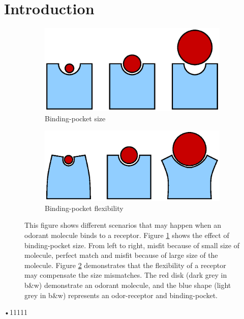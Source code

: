 \documentclass[11pt]{paper} %
\begin{document}
\section{Introduction}
\begin{figure}
	\centering
	\begin{subfigure}[b]{0.45 \textwidth}
		\includegraphics[width=\textwidth]{fig/binding-pocket}
		\caption{Binding-pocket size}
		\label{fig:pocket-size}
	\end{subfigure}
	\begin{subfigure}[b]{0.45 \textwidth}
		\includegraphics[width=\textwidth]{fig/binding-pocket-flex}
		\caption{Binding-pocket flexibility}
		\label{fig:pocket-flex}
	\end{subfigure}
	\caption{This figure shows different scenarios that may happen when an odorant molecule binds to a receptor. 
	Figure \ref{fig:pocket-size} shows the effect of binding-pocket size. 
	From left to right, misfit because of small size of molecule, perfect match and misfit because of large size of the molecule.
	Figure \ref{fig:pocket-flex} demonstrates that the flexibility of a receptor may compensate the size mismatches. 
	The red disk (dark grey in b\&w) demonstrate an odorant molecule, 
	and the blue shape (light grey in b\&w) represents an odor-receptor and binding-pocket.}
	\label{fig:binding-pocket}
\end{figure}•11111
\end{document}
